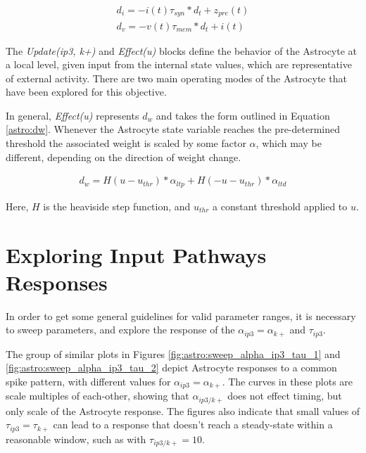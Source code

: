     \begin{align}
      d_{i} = -i(t) \tau_{syn} * d_t + z_{pre}(t) \label{eq:lif:i} \\
      d_{v} = -v(t) \tau_{mem} * d_t + i(t) \label{eq:lif:v}
    \end{align}

    The \emph{Update(ip3, k+)} and \emph{Effect(u)} blocks define the behavior
    of the Astrocyte at a local level, given input from the internal state
    values, which are representative of external activity. There are two main
    operating modes of the Astrocyte that have been explored for this objective.

    In general, \emph{Effect(u)} represents $d_w$ and takes the form outlined in
    Equation \ref{astro:dw}. Whenever the Astrocyte state variable reaches the
    pre-determined threshold the associated weight is scaled by some factor
    $\alpha$, which may be different, depending on the direction of weight
    change.

    \begin{align}
      d_w = H(u - u_{thr}) * \alpha_{ltp} + H(-u - u_{thr}) * \alpha_{ltd} \label{astro:dw}
    \end{align}

    Here, $H$ is the heaviside step function, and $u_{thr}$ a constant threshold
    applied to $u$.
    
    \section{Exploring Input Pathways Responses}

    In order to get some general guidelines for valid parameter ranges, it is
    necessary to sweep parameters, and explore the response of the
    $\alpha_{ip3}=\alpha_{k+}$ and $\tau_{ip3}$.
    


    The group of similar plots in Figures \ref{fig:astro:sweep_alpha_ip3_tau_1} and
    \ref{fig:astro:sweep_alpha_ip3_tau_2} depict Astrocyte responses to a common
    spike pattern, with different values for $\alpha_{ip3}=\alpha_{k+}$. The
    curves in these plots are scale multiples of each-other, showing that
    $\alpha_{ip3/k+}$ does not effect timing, but only scale of the Astrocyte
    response. The figures also indicate that small values of
    $\tau_{ip3}=\tau_{k+}$ can lead to a response that doesn't reach a
    steady-state within a reasonable window, such as with $\tau_{ip3/k+} = 10$.

